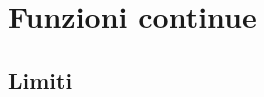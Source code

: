 


\chapter{Funzioni continue}

\begin{comment}
 
Schema del capitolo
===================

Limiti
------

Continuità
----------

  C. in un punto
  ''''''''''''''
  
    Definizione
    ...........
  
      Definizioni equivalenti
      
    Punti di discontinuità e di non derivabilità
    ............................................
 
  C. in un intervallo
  '''''''''''''''''''
  
    Definizione
    ...........
  
      Teorema funzioni elementari
      Teorema composizione di funzioni
      
    Insieme e sottoinsiemi delle funzioni
    .....................................

\end{comment}

\begin{comment}
\begin{center}
\begin{inaccessibleblock}[TODO.]
  \telescopio
\end{inaccessibleblock}
\end{center}
\end{comment}

\begin{center}
\begin{inaccessibleblock}[TODO.]
%   
\end{inaccessibleblock}
\end{center}

\section{Limiti}
\label{sec:cont_limiti}

